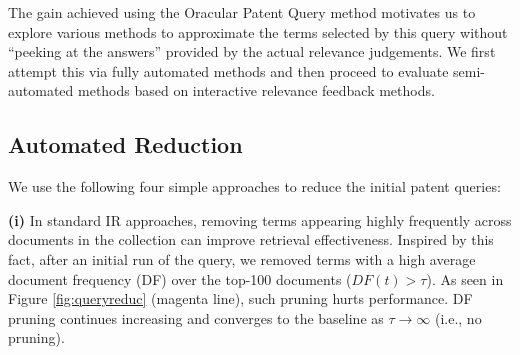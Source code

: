 The gain achieved using the Oracular Patent Query method motivates us to explore various methods to approximate the terms
selected by this query without ``peeking at the answers'' provided by
the actual relevance judgements.  We first attempt this via fully
automated methods and then proceed to evaluate semi-automated methods
based on interactive relevance feedback methods.

\subsection{Automated Reduction}
\label{sec:AutomatedReduction}
%
We use the following four simple approaches to reduce the initial patent queries: 

\vspace*{0.5mm}
\noindent \textbf{(i)} In standard IR approaches, removing terms appearing highly frequently across documents in the collection can improve retrieval effectiveness. Inspired by this fact, after an initial run of the query, we removed terms  with a high average document frequency (DF) over the top-100 documents ($\mathit{DF}(t)>\tau$). As seen in Figure \ref{fig:queryreduc} (magenta line), such pruning hurts performance. DF pruning continues increasing and converges to the baseline as $\tau \to \infty $ (i.e., no pruning).

